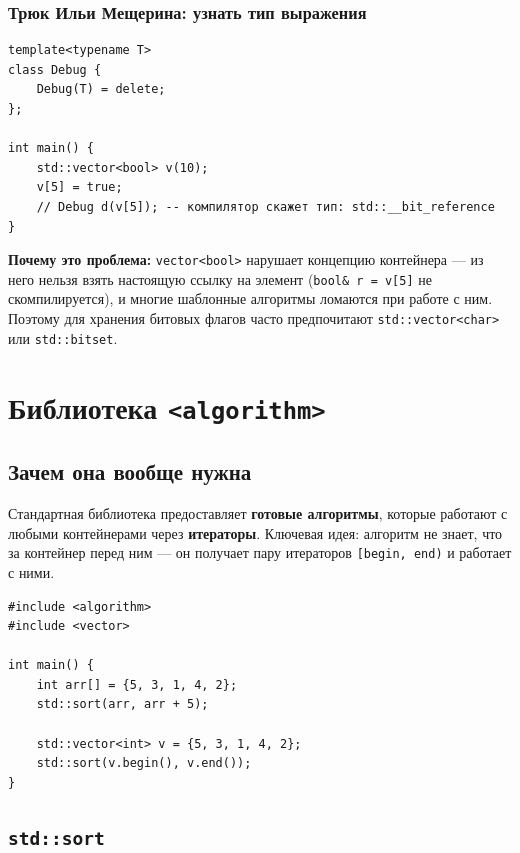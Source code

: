 \documentclass[a4paper,12pt]{article}
\begin{document}
\subsubsection{Трюк Ильи Мещерина: узнать тип выражения}

\begin{lstlisting}
template<typename T>
class Debug {
    Debug(T) = delete;
};

int main() {
    std::vector<bool> v(10);
    v[5] = true;
    // Debug d(v[5]); -- компилятор скажет тип: std::__bit_reference
}
\end{lstlisting}

\textbf{Почему это проблема:} \texttt{vector<bool>} нарушает концепцию
контейнера --- из него нельзя взять настоящую ссылку на элемент
(\texttt{bool\& r = v[5]} не скомпилируется), и многие шаблонные
алгоритмы ломаются при работе с ним. Поэтому для хранения битовых флагов
часто предпочитают \texttt{std::vector<char>} или \texttt{std::bitset}.

\newpage
\section{Библиотека \texttt{<algorithm>}}

\subsection{Зачем она вообще нужна}

Стандартная библиотека предоставляет \textbf{готовые алгоритмы},
которые работают с любыми контейнерами через \textbf{итераторы}.
Ключевая идея: алгоритм не знает, что за контейнер перед ним ---
он получает пару итераторов \texttt{[begin, end)} и работает с ними.

\begin{lstlisting}
#include <algorithm>
#include <vector>

int main() {
    int arr[] = {5, 3, 1, 4, 2};
    std::sort(arr, arr + 5);

    std::vector<int> v = {5, 3, 1, 4, 2};
    std::sort(v.begin(), v.end());
}
\end{lstlisting}

\subsection{\texttt{std::sort}}
\end{document}
